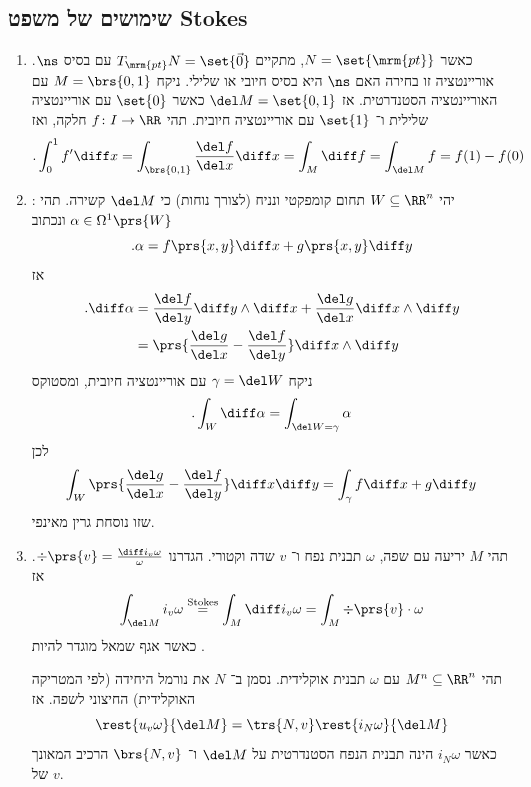 \documentclass[a4paper,10pt,twoside,openany]{book}
\begin{document}
\subsection{שימושים של משפט
\textenglish{Stokes}}
\begin{enumerate}
\item כאשר
$N = \set{\mrm{pt}}$,
מתקיים
$T_{\mrm{pt}}N = \set{\vec{0}}$
עם בסיס
$\ns$.
אוריינטציה זו בחירה האם
$\ns$
היא בסיס חיובי או שלילי.
ניקח
$M = \brs{0,1}$
עם האוריינטציה הסטנדרטית.
אז
$\del M = \set{0,1}$
כאשר
$\set{0}$
עם אוריינטציה שלילית ו־%
$\set{1}$
עם אוריינטציה חיובית.
תהי
$f \colon I \to \RR$
חלקה, ואז
\[\text{.} \int_{0}^{1} f' \diff x = \int_{\brs{0,1}} \frac{\del f}{\del x} \diff x = \int_M \diff f = \int_{\del M} f = f(1) - f(0)\]

\item {}:
יהי
$W \subseteq \RR^n$
תחום קומפקטי ונניח (לצורך נוחות) כי
$\del M$
קשירה.
תהי
$\alpha \in \Omega^1 \prs{W}$
ונכתוב
\[\text{.} \alpha = f\prs{x,y} \diff x + g\prs{x,y} \diff y\]
אז
\begin{align*}
\text{.} \diff \alpha &= \frac{\del f}{\del y} \diff y \wedge \diff x + \frac{\del g}{\del x } \diff x \wedge \diff y \\&= \prs{\frac{\del g}{\del x} - \frac{\del f}{\del y}} \diff x \wedge \diff y
\end{align*}
ניקח
$\gamma = \del W$
עם אוריינטציה חיובית, ומסטוקס
\[\text{.} \int_W \diff \alpha = \int_{\del W = \gamma} \alpha\]
לכן
\begin{align*}
\int_W \prs{\frac{\del g}{\del x} - \frac{\del f}{\del y}} \diff x \diff y = \int_{\gamma} f\diff x + g\diff y
\end{align*}
שזו נוסחת גרין מאינפי.
\item {}
תהי
$M$
יריעה עם שפה,
$\omega$
תבנית נפח ו־%
$v$
שדה וקטורי.
הגדרנו
$\div\prs{v} = \frac{\diff i_v \omega}{\omega}$.
אז
\begin{align*}
\int_{\del M} i_v \omega \stackrel{\text{Stokes}}{=} \int_M \diff i_v \omega = \int_M \div \prs{v} \cdot \omega
\end{align*}
כאשר אגף שמאל מוגדר להיות
.
\begin{example}
תהי
$M^n \subseteq \RR^n$
עם
$\omega$
תבנית אוקלידית. נסמן ב־%
$N$
את נורמל היחידה (לפי המטריקה האוקלידית) החיצוני לשפה.
אז
\[\rest{u_v \omega}{\del M} = \trs{N,v} \rest{i_N \omega}{\del M}\]
כאשר
$i_N \omega$
הינה תבנית הנפח הסטנדרטית על
$\del M$
ו־%
$\brs{N,v}$
הרכיב המאונך של
$v$.\\

\end{example}
\end{enumerate}
\end{document}
